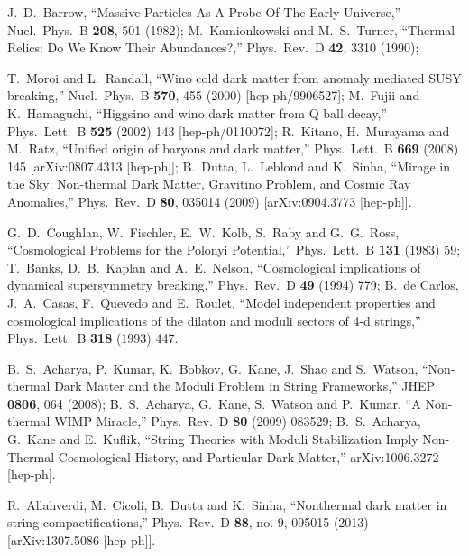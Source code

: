 \documentclass[11pt,a4paper]{article}
\begin{document}
\begin{thebibliography}{99}
J.~D.~Barrow,
  ``Massive Particles As A Probe Of The Early Universe,''
  Nucl.\ Phys.\ B {\bf 208}, 501 (1982);
 M.~Kamionkowski and M.~S.~Turner,
  ``Thermal Relics: Do We Know Their Abundances?,''
  Phys.\ Rev.\ D {\bf 42}, 3310 (1990);

  T.~Moroi and L.~Randall,
  ``Wino cold dark matter from anomaly mediated SUSY breaking,''
  Nucl.\ Phys.\ B {\bf 570}, 455 (2000)
  [hep-ph/9906527];
  M.~Fujii and K.~Hamaguchi,
  ``Higgsino and wino dark matter from Q ball decay,''
  Phys.\ Lett.\ B {\bf 525} (2002) 143
  [hep-ph/0110072];
    R.~Kitano, H.~Murayama and M.~Ratz,
  ``Unified origin of baryons and dark matter,''
  Phys.\ Lett.\ B {\bf 669} (2008) 145
  [arXiv:0807.4313 [hep-ph]];
B.~Dutta, L.~Leblond and K.~Sinha,
  ``Mirage in the Sky: Non-thermal Dark Matter, Gravitino Problem, and Cosmic Ray Anomalies,''
  Phys.\ Rev.\ D {\bf 80}, 035014 (2009)
  [arXiv:0904.3773 [hep-ph]].

G.~D.~Coughlan, W.~Fischler, E.~W.~Kolb, S.~Raby and G.~G.~Ross,
  ``Cosmological Problems for the Polonyi Potential,''
  Phys.\ Lett.\ B {\bf 131} (1983) 59;
T.~Banks, D.~B.~Kaplan and A.~E.~Nelson,
  ``Cosmological implications of dynamical supersymmetry breaking,''
  Phys.\ Rev.\ D {\bf 49} (1994) 779;
B.~de Carlos, J.~A.~Casas, F.~Quevedo and E.~Roulet,
  ``Model independent properties and cosmological implications of the dilaton and moduli sectors of 4-d strings,''
  Phys.\ Lett.\ B {\bf 318} (1993) 447.

B.~S.~Acharya, P.~Kumar, K.~Bobkov, G.~Kane, J.~Shao and S.~Watson,
  ``Non-thermal Dark Matter and the Moduli Problem in String Frameworks,''
  JHEP {\bf 0806}, 064 (2008);
B.~S.~Acharya, G.~Kane, S.~Watson and P.~Kumar,
  ``A Non-thermal WIMP Miracle,''
  Phys.\ Rev.\ D {\bf 80} (2009) 083529;
B.~S.~Acharya, G.~Kane and E.~Kuflik,
  ``String Theories with Moduli Stabilization Imply Non-Thermal Cosmological History, and Particular Dark Matter,''
  arXiv:1006.3272 [hep-ph].

R.~Allahverdi, M.~Cicoli, B.~Dutta and K.~Sinha,
  ``Nonthermal dark matter in string compactifications,''
  Phys.\ Rev.\ D {\bf 88}, no. 9, 095015 (2013)
  [arXiv:1307.5086 [hep-ph]].


\end{thebibliography}
\end{document}
